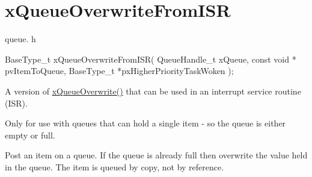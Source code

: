 \hypertarget{group__x_queue_overwrite_from_i_s_r}{}\section{x\+Queue\+Overwrite\+From\+I\+SR}
\label{group__x_queue_overwrite_from_i_s_r}
queue. h 
\begin{DoxyPre}
BaseType\_t xQueueOverwriteFromISR(
                           QueueHandle\_t xQueue,
                           const void * pvItemToQueue,
                           BaseType\_t *pxHigherPriorityTaskWoken
                      );
\end{DoxyPre}


A version of \hyperlink{vendor_2ceedling_2plugins_2freertos_2src_2freertos_2include_2queue_8h_a8e9ced123b5a0e37a36d3bbdb2e56b4e}{x\+Queue\+Overwrite()} that can be used in an interrupt service routine (I\+SR).

Only for use with queues that can hold a single item -\/ so the queue is either empty or full.

Post an item on a queue. If the queue is already full then overwrite the value held in the queue. The item is queued by copy, not by reference.


